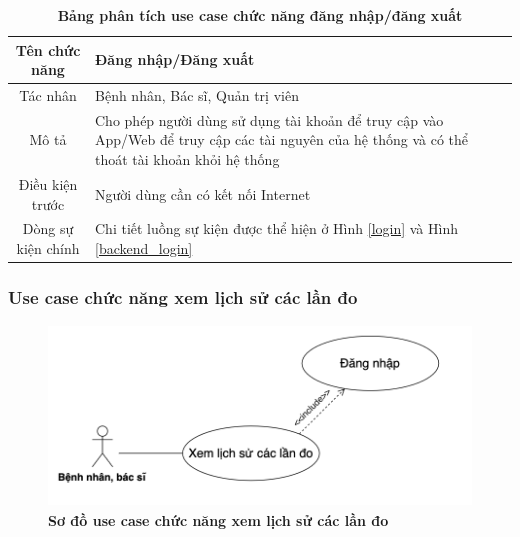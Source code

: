   \begin{table}[H]
    \caption{\bfseries \fontsize{12pt}{0pt}\selectfont Bảng phân tích use case chức năng đăng nhập/đăng xuất}
    \centering
    \begin{tabularx}{0.9\textwidth}{|c|X|}
      \hline
      \textbf{Tên chức năng} & \textbf{Đăng nhập/Đăng xuất} \\
      \hline
      Tác nhân & Bệnh nhân, Bác sĩ, Quản trị viên \\
      \hline
      Mô tả & Cho phép người dùng sử dụng tài khoản để truy cập vào App/Web để truy cập các tài nguyên của hệ thống và
      có thể thoát tài khoản khỏi hệ thống\\
      \hline
      Điều kiện trước & Người dùng cần có kết nối Internet \\
      \hline
      Dòng sự kiện chính & 
        Chi tiết luồng sự kiện được thể hiện ở Hình \ref{login} và Hình \ref{backend_login}\\
      \hline
    \end{tabularx}
  \end{table}

\subsubsection{Use case chức năng xem lịch sử các lần đo}
  \begin{figure}[H]
    \centering
    \includegraphics[width=12cm,height=4.8cm]{Images/use_case/use_case_view_history_record.png}
    \caption[Sơ đồ use case chức năng xem lịch sử các lần đo]{\bfseries \fontsize{12pt}{0pt}
    \selectfont Sơ đồ use case chức năng xem lịch sử các lần đo}
    \label{use_case_view_history_record} %
  \end{figure}

